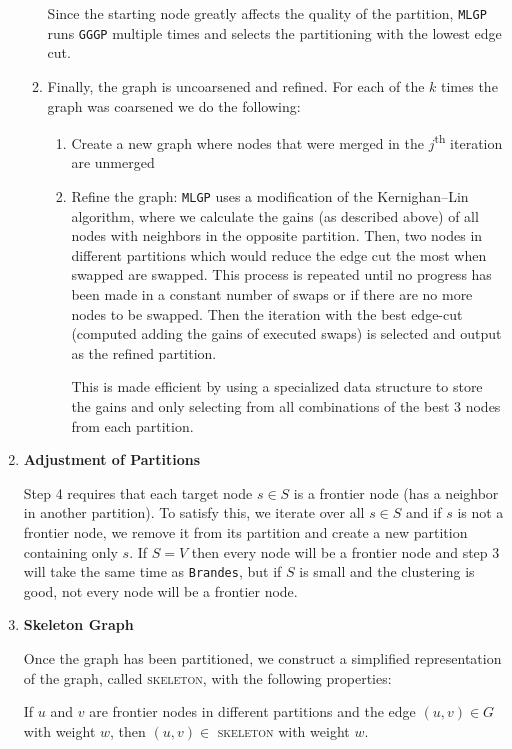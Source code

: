 \documentclass[12pt,a4paper,twoside,openright]{report}
\newcommand{\ttt}[1]{\texttt{#1}}
\begin{document}
\begin{enumerate}[label = \textbf{\arabic*.}]
\begin{enumerate}[label = \arabic*.]
			Since the starting node greatly affects the quality of the partition, \ttt{MLGP} runs \ttt{GGGP} multiple times and selects the partitioning with the lowest edge cut.
			
			\item Finally, the graph is uncoarsened and refined. For each of the $k$ times the graph was coarsened we do the following: 
			\begin{enumerate}
				\item Create a new graph where nodes that were merged in the $j$\textsuperscript{th} iteration are unmerged
				
				
				\item Refine the graph: \ttt{MLGP} uses a modification of the \nohyphens{Kernighan–Lin} algorithm, where we calculate the gains (as described above) of all nodes with neighbors in the opposite partition. Then, two nodes in different partitions which would reduce the edge cut the most when swapped are swapped. This process is repeated until no progress has been made in a constant number of swaps or if there are no more nodes to be swapped. Then the iteration with the best edge-cut (computed adding the gains of executed swaps) is selected and output as the refined partition.
				
				This is made efficient by using a specialized data structure to store the gains and only selecting from all combinations of the best 3 nodes from each partition.
			\end{enumerate}
		\end{enumerate}
		
		\item \textbf{Adjustment of Partitions}
		
		
		Step 4 requires that each target node $s \in S$ is a frontier node (has a neighbor in another partition). To satisfy this, we iterate over all $s \in S$ and if $s$ is not a frontier node, we remove it from its partition and create a new partition containing only $s$. If $S = V$ then every node will be a frontier node and step 3 will take the same time as \ttt{Brandes}, but if $S$ is small and the clustering is good, not every node will be a frontier node.
		\item \textbf{Skeleton Graph}
		
		Once the graph has been partitioned, we construct a simplified representation of the graph, called \textsc{skeleton}, with the following properties:
		
		If $u$ and $v$ are frontier nodes in different partitions and the edge $(u,v) \in G$ with weight $w$, then $(u,v) \in $ \textsc{skeleton} with weight $w$. 
		

\end{enumerate}
\end{document}
